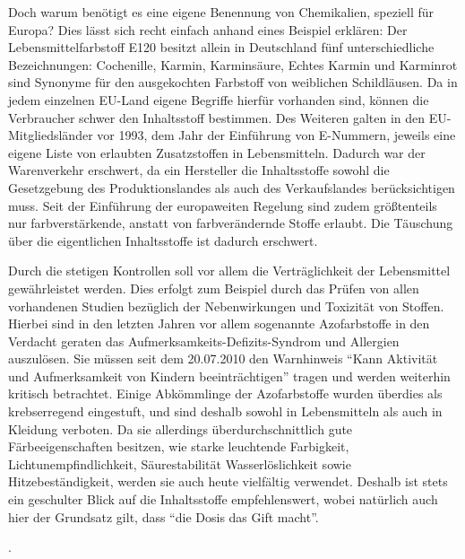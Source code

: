 \documentclass[11pt]{scrreprt}
\begin{document}
Doch warum benötigt es eine eigene Benennung von Chemikalien, speziell für Europa?
Dies lässt sich recht einfach anhand eines Beispiel erklären: Der Lebensmittelfarbstoff E120 besitzt allein in Deutschland fünf unterschiedliche Bezeichnungen: Cochenille, Karmin, Karminsäure, Echtes Karmin und Karminrot sind Synonyme  für den ausgekochten Farbstoff von weiblichen Schildläusen. Da in jedem einzelnen EU-Land eigene Begriffe hierfür vorhanden sind, können die Verbraucher schwer den Inhaltsstoff bestimmen.
Des Weiteren galten in den EU-Mitgliedsländer vor 1993, dem Jahr der Einführung von E-Nummern, jeweils eine eigene Liste von erlaubten Zusatzstoffen in Lebensmitteln. Dadurch war der Warenverkehr erschwert, da ein Hersteller die Inhaltsstoffe sowohl die Gesetzgebung des Produktionslandes als auch des Verkaufslandes berücksichtigen muss. Seit der Einführung der europaweiten Regelung sind zudem größtenteils nur farbverstärkende, anstatt von farbverändernde Stoffe erlaubt. Die Täuschung über die eigentlichen Inhaltsstoffe ist dadurch erschwert.

 Durch die stetigen Kontrollen soll vor allem die Verträglichkeit der Lebensmittel gewährleistet werden. Dies erfolgt zum Beispiel durch das Prüfen von allen vorhandenen Studien bezüglich der Nebenwirkungen und Toxizität von Stoffen. Hierbei sind in den letzten Jahren vor allem sogenannte Azofarbstoffe in den Verdacht geraten das Aufmerksamkeits-Defizits-Syndrom und Allergien auszulösen.  Sie müssen seit dem 20.07.2010 den Warnhinweis \enquote{Kann Aktivität und Aufmerksamkeit von Kindern beeinträchtigen} tragen und werden weiterhin kritisch betrachtet. Einige Abkömmlinge der Azofarbstoffe wurden überdies als krebserregend eingestuft, und sind  deshalb sowohl in Lebensmitteln  als auch in Kleidung verboten. Da sie allerdings überdurchschnittlich gute Färbeeigenschaften besitzen, wie starke leuchtende Farbigkeit, Lichtunempfindlichkeit, Säurestabilität Wasserlöslichkeit sowie Hitzebeständigkeit, werden sie auch heute vielfältig verwendet\parencite[S.50]{Heinze.1986}. Deshalb ist stets ein geschulter Blick auf die Inhaltsstoffe empfehlenswert, wobei natürlich auch hier der Grundsatz gilt, dass \enquote{die Dosis das Gift macht}.

 \parencite[S. 12]{Schobert.2007}. 
 
 
\end{document}
